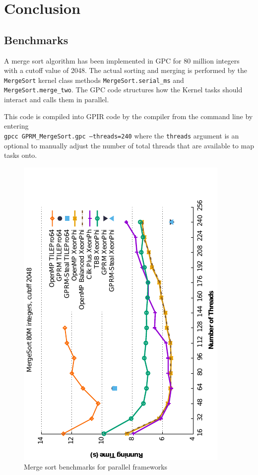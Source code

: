 \chapter{Conclusion}

\section{Benchmarks}

A merge sort algorithm has been implemented in GPC for 80 million integers with a cutoff value 
of 2048. The actual sorting and merging is performed by the \texttt{MergeSort} kernel class
methods \texttt{MergeSort.serial\_ms} and \texttt{MergeSort.merge\_two}. The GPC code structures
how the Kernel tasks should interact and calls them in parallel. 


\overfullrule=2cm
This code is compiled into GPIR code by the compiler from the command line by entering \\
\texttt{gpcc GPRM\_MergeSort.gpc --threads=240} where the \texttt{threads} argument is an 
optional to manually adjust the number of total threads that are available to map tasks onto.

\newpage

\begin{figure}[!htb]
\centerline{\includegraphics[angle=270, scale=1.3]{graphs/benchmark.pdf}}
\caption{Merge sort benchmarks for parallel frameworks \cite{GPRMBench}}
\label{fig:bench}
\end{figure}

